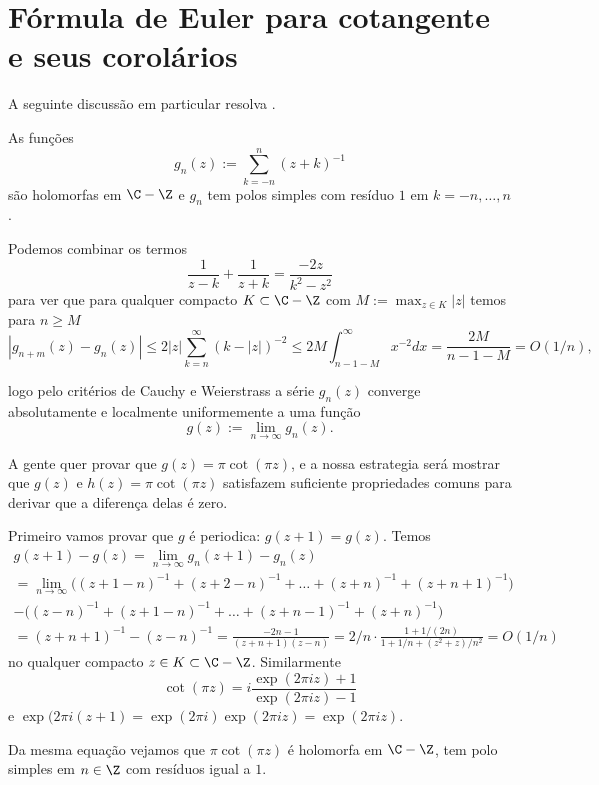 \section{Fórmula de Euler para cotangente e seus corolários}

A seguinte discussão em particular resolva .


As funções
\begin{equation*}
g_n(z) := \sum_{k=-n}^n (z+k)^{-1} 
\end{equation*}
são holomorfas em $\C - \Z$ e $g_n$ tem polos simples com resíduo $1$
em $k=-n,\dots,n$.

Podemos combinar os termos
\[ \frac{1}{z-k} + \frac{1}{z+k} = \frac{-2z}{k^2-z^2} \]
para ver que para qualquer compacto $K \subset \C-\Z$ com $M := \max_{z\in K} |z|$ temos
para $n\geq M$
\[ |g_{n+m}(z) - g_n(z)| \leq 2|z| \sum_{k=n}^\infty (k-|z|)^{-2}
\leq 2 M \int_{n-1-M}^\infty x^{-2} dx = \frac{2 M}{n-1-M} = O(1/n), \]

logo pelo critérios de Cauchy e Weierstrass a série
$g_n(z)$ converge absolutamente e localmente uniformemente a uma função
\[ g(z) := \lim_{n\to\infty} g_n(z) .\]

A gente quer provar que $g(z) = \pi \cot(\pi z)$,
e a nossa estrategia será mostrar que $g(z)$ e $h(z) = \pi \cot(\pi z)$
satisfazem suficiente propriedades comuns para derivar que a diferença delas é zero.

Primeiro vamos provar que $g$ é periodica: $g(z+1) = g(z)$.
Temos
\begin{multline*}
g(z+1) - g(z) = \lim_{n\to\infty} g_n(z+1) - g_n(z) \\
= \lim_{n\to \infty} \big((z+1-n)^{-1} + (z+2-n)^{-1} + \dots + (z+n)^{-1} + (z+n+1)^{-1}\big)
\\ -\big((z-n)^{-1} + (z+1-n)^{-1} + \dots + (z+n-1)^{-1} + (z+n)^{-1}\big)
\\  = (z+n+1)^{-1} - (z-n)^{-1} = \frac{-2n-1}{(z+n+1)(z-n)} = 2/n \cdot \frac{1+1/(2n)}{1+1/n+(z^2+z)/n^2} = O(1/n)
\end{multline*}
no qualquer compacto $z\in K \subset \C-\Z$.
Similarmente
\begin{equation}
\cot(\pi z) = i \frac{\exp(2\pi i z)+1}{\exp(2\pi i z)-1}
\end{equation}
e $\exp(2\pi i(z+1) = \exp(2\pi i) \exp(2\pi i z) = \exp(2 \pi i z)$.

Da mesma equação vejamos que $\pi \cot(\pi z)$ 
é holomorfa em $\C-\Z$,
tem polo simples em $n\in\Z$ com resíduos igual a $1$.

